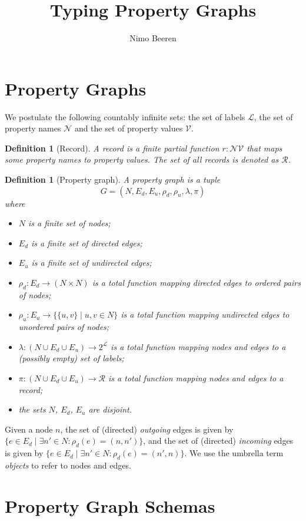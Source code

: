 \documentclass[a4paper]{article}
\title{Typing Property Graphs}
\author{Nimo Beeren}
\makeatletter
\newtheorem{definition}[theorem]{Definition}
\newcommand{\pto}{}%
\DeclareRobustCommand{\pto}{\mathrel{\mathpalette\p@to@gets\to}}
\newcommand{\p@to@gets}[2]{%
  \ooalign{\hidewidth$\m@th#1\mapstochar\mkern5mu$\hidewidth\cr$\m@th#1\to$\cr}%
}
\makeatother
\begin{document}
\section{Property Graphs}

We postulate the following countably infinite sets: the set of labels $\mathcal{L}$, the set of property names $\mathcal{N}$ and the set of property values $\mathcal{V}$.

\begin{definition}[Record]
  A \emph{record} is a finite partial function $r : \mathcal{N} \pto \mathcal{V}$ that maps some property names to property values. The set of all records is denoted as $\mathcal{R}$.
\end{definition}

\begin{definition}[Property graph]
  A \emph{property graph} is a tuple \[G = (N, E_d, E_u, \rho_d, \rho_u, \lambda, \pi)\] where
  \begin{itemize}
    \item $N$ is a finite set of nodes;
    \item $E_d$ is a finite set of directed edges;
    \item $E_u$ is a finite set of undirected edges;
    \item $\rho_d : E_d \to (N \times N)$ is a total function mapping directed edges to ordered pairs of nodes;
    \item $\rho_u : E_u \to \{\{u, v\} \mid u, v \in N\}$ is a total function mapping undirected edges to unordered pairs of nodes;
    \item $\lambda : (N \cup E_d \cup E_u) \to 2^{\mathcal{L}}$ is a total function mapping nodes and edges to a (possibly empty) set of labels;
    \item $\pi : (N \cup E_d \cup E_u) \to \mathcal{R}$ is a total function mapping nodes and edges to a record;
    \item the sets $N$, $E_d$, $E_u$ are disjoint.
  \end{itemize}
\end{definition}

Given a node $n$, the set of (directed) \emph{outgoing} edges is given by $\{e \in E_d \mid \exists n' \in N : \rho_d(e) = (n, n')\}$, and the set of (directed) \emph{incoming} edges is given by $\{e \in E_d \mid \exists n' \in N : \rho_d(e) = (n', n)\}$. We use the umbrella term \emph{objects} to refer to nodes and edges.

\section{Property Graph Schemas}
\end{document}
